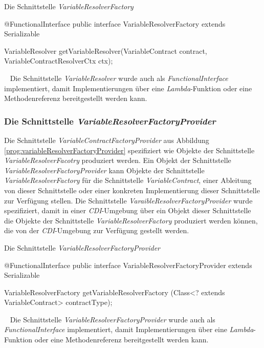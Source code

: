 \begin{program}[h]
\caption{Die Schnittstelle \emph{VariableResolverFactory}}
\label{prog:variableResolverFactory}
\begin{JavaCode}
@FunctionalInterface
public interface VariableResolverFactory extends Serializable {

  VariableResolver getVariableResolver(VariableContract contract,
                                       VariableContractResolverCtx ctx);
}
\end{JavaCode}
\end{program}
\ \newline
Die Schnittstelle \emph{VariableResolver} wurde auch als \emph{FunctionalInterface} implementiert, damit Implementierungen über eine \emph{Lambda}-Funktion oder eine Methodenreferenz bereitgestellt werden kann.

\subsubsection{Die Schnittstelle \emph{VariableResolverFactoryProvider}}
\label{sec:VariableResolverFactoryProvider}
Die Schnittstelle \emph{VariableContractFactoryProvider} aus Abbildung \ref{prog:variableResolverFactoryProvider} spezifiziert wie Objekte der Schnittstelle \emph{VariableResolverFacotry} produziert werden. Ein Objekt der Schnittstelle \emph{VariableResolverFactoryProvider} kann Objekte der Schnittstelle \emph{VariableResolverFactory} für die Schnittstelle \emph{VariableContract}, einer Ableitung von dieser Schnittstelle oder einer konkreten Implementierung dieser Schnittstelle zur Verfügung stellen. Die Schnittstelle \emph{VaraibleResolverFactoryProvider} wurde spezifiziert, damit in einer \emph{CDI}-Umgebung über ein Objekt dieser Schnittstelle die Objekte der Schnittstelle \emph{VariableResolverFactory} produziert werden können, die von der \emph{CDI}-Umgebung zur Verfügung gestellt werden.

\begin{program}[h]
\caption{Die Schnittstelle \emph{VariableResolverFactoryProvider}}
\label{prog:variableResolverFactoryProvider}
\begin{JavaCode}
@FunctionalInterface
public interface VariableResolverFactoryProvider extends Serializable {

    VariableResolverFactory getVariableResolverFactory
            (Class<? extends VariableContract> contractType);
}
\end{JavaCode}
\end{program}
\ \newline
Die Schnittstelle \emph{VariableResolverFactoryProvider} wurde auch als \emph{FunctionalInterface} implementiert, damit Implementierungen über eine \emph{Lambda}-Funktion oder eine Methodenreferenz bereitgestellt werden kann.

